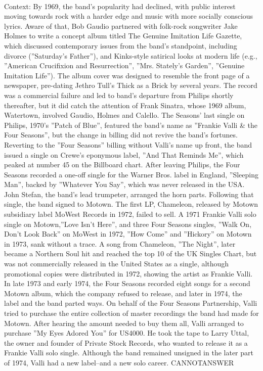 \documentclass[11pt,a4paper, onecolumn]{article}
\begin{document}
\\ Context: By 1969, the band's popularity had declined, with public interest moving towards rock with a harder edge and music with more socially conscious lyrics. Aware of that, Bob Gaudio partnered with folk-rock songwriter Jake Holmes to write a concept album titled The Genuine Imitation Life Gazette, which discussed contemporary issues from the band's standpoint, including divorce (''Saturday's Father''), and Kinks-style satirical looks at modern life (e.g., ''American Crucifixion and Resurrection'', ''Mrs. Stately's Garden'', ''Genuine Imitation Life''). The album cover was designed to resemble the front page of a newspaper, pre-dating Jethro Tull's Thick as a Brick by several years. The record was a commercial failure and led to band's departure from Philips shortly thereafter, but it did catch the attention of Frank Sinatra, whose 1969 album, Watertown, involved Gaudio, Holmes and Calello. The Seasons' last single on Philips, 1970's ''Patch of Blue'', featured the band's name as ''Frankie Valli & the Four Seasons'', but the change in billing did not revive the band's fortunes. Reverting to the ''Four Seasons'' billing without Valli's name up front, the band issued a single on Crewe's eponymous label, ''And That Reminds Me'', which peaked at number 45 on the Billboard chart. After leaving Philips, the Four Seasons recorded a one-off single for the Warner Bros. label in England, ''Sleeping Man'', backed by ''Whatever You Say'', which was never released in the USA. John Stefan, the band's lead trumpeter, arranged the horn parts. Following that single, the band signed to Motown. The first LP, Chameleon, released by Motown subsidiary label MoWest Records in 1972, failed to sell. A 1971 Frankie Valli solo single on Motown,''Love Isn't Here'', and three Four Seasons singles, ''Walk On, Don't Look Back'' on MoWest in 1972, ''How Come'' and ''Hickory'' on Motown in 1973, sank without a trace. A song from Chameleon, ''The Night'', later became a Northern Soul hit and reached the top 10 of the UK Singles Chart, but was not commercially released in the United States as a single, although promotional copies were distributed in 1972, showing the artist as Frankie Valli. In late 1973 and early 1974, the Four Seasons recorded eight songs for a second Motown album, which the company refused to release, and later in 1974, the label and the band parted ways. On behalf of the Four Seasons Partnership, Valli tried to purchase the entire collection of master recordings the band had made for Motown. After hearing the amount needed to buy them all, Valli arranged to purchase ''My Eyes Adored You'' for  US4000. He took the tape to Larry Uttal, the owner and founder of Private Stock Records, who wanted to release it as a Frankie Valli solo single. Although the band remained unsigned in the later part of 1974, Valli had a new label--and a new solo career. CANNOTANSWER
\end{document}
